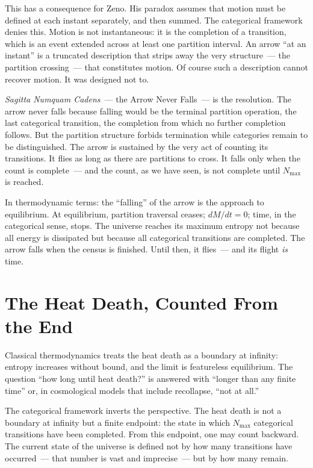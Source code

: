 This has a consequence for Zeno. His paradox assumes that motion must be defined
at each instant separately, and then summed. The categorical framework denies this.
Motion is not instantaneous: it is the completion of a transition, which is an
event extended across at least one partition interval. An arrow ``at an instant''
is a truncated description that strips away the very structure~--- the partition
crossing~--- that constitutes motion. Of course such a description cannot recover
motion. It was designed not to.

\emph{Sagitta Numquam Cadens}~--- the Arrow Never Falls~--- is the resolution.
The arrow never falls because falling would be the terminal partition operation,
the last categorical transition, the completion from which no further completion
follows. But the partition structure forbids termination while categories remain
to be distinguished. The arrow is sustained by the very act of counting its
transitions. It flies as long as there are partitions to cross. It falls only
when the count is complete~--- and the count, as we have seen, is not complete
until $N_{\max}$ is reached.

In thermodynamic terms: the ``falling'' of the arrow is the approach to equilibrium.
At equilibrium, partition traversal ceases; $dM/dt = 0$; time, in the categorical
sense, stops. The universe reaches its maximum entropy not because all energy
is dissipated but because all categorical transitions are completed. The arrow
falls when the census is finished. Until then, it flies~--- and its flight
\emph{is} time.


\section*{The Heat Death, Counted From the End}

Classical thermodynamics treats the heat death as a boundary at infinity:
entropy increases without bound, and the limit is featureless equilibrium.
The question ``how long until heat death?'' is answered with ``longer than any
finite time'' or, in cosmological models that include recollapse, ``not at all.''

The categorical framework inverts the perspective. The heat death is not a
boundary at infinity but a finite endpoint: the state in which $N_{\max}$ categorical
transitions have been completed. From this endpoint, one may count backward.
The current state of the universe is defined not by how many transitions have
occurred~--- that number is vast and imprecise~--- but by how many remain.

